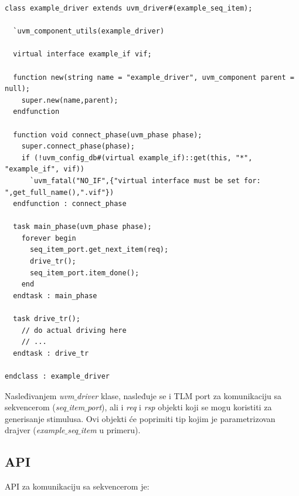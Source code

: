 \begin{lstlisting}
class example_driver extends uvm_driver#(example_seq_item);

  `uvm_component_utils(example_driver)

  virtual interface example_if vif;

  function new(string name = "example_driver", uvm_component parent = null);
    super.new(name,parent);
  endfunction

  function void connect_phase(uvm_phase phase);
    super.connect_phase(phase);
    if (!uvm_config_db#(virtual example_if)::get(this, "*", "example_if", vif))
      `uvm_fatal("NO_IF",{"virtual interface must be set for: ",get_full_name(),".vif"})
  endfunction : connect_phase

  task main_phase(uvm_phase phase);
    forever begin
      seq_item_port.get_next_item(req);
      drive_tr();
      seq_item_port.item_done();
    end
  endtask : main_phase

  task drive_tr();
    // do actual driving here
    // ...
  endtask : drive_tr

endclass : example_driver
\end{lstlisting}

Nasleđivanjem \emph{uvm\(\_\)driver} klase, nasleđuje se i TLM port za
komunikaciju sa sekvencerom (\emph{seq\(\_\)item\(\_\)port}), ali i \emph{req} i
\emph{rsp} objekti koji se mogu koristiti za generisanje stimulusa. Ovi objekti
će poprimiti tip kojim je parametrizovan drajver (\emph{example\(\_\)seq\(\_\)item} u
primeru).


\subsection{API}

API za komunikaciju sa sekvencerom je:

